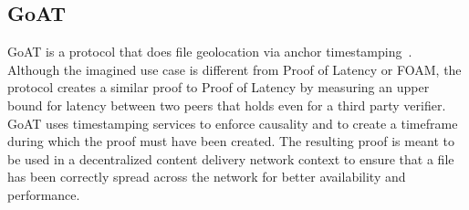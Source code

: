 \subsection{GoAT}
GoAT is a protocol that does file geolocation via anchor timestamping~\cite{Maram_undated-it}. Although the imagined use case is different from Proof of Latency or FOAM, the protocol creates a similar proof to Proof of Latency by measuring an upper bound for latency between two peers that holds even for a third party verifier. GoAT uses timestamping services to enforce causality and to create a timeframe during which the proof must have been created. The resulting proof is meant to be used in a decentralized content delivery network context to ensure that a file has been correctly spread across the network for better availability and performance.

